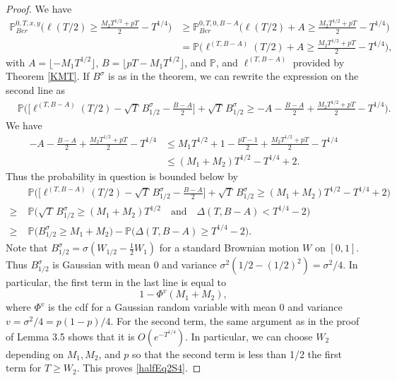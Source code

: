 \begin{proof}
		We have
	\begin{align*}
	\mathbb{P}^{0,T,x,y}_{Ber}\bigg( \ell( T/2 )  \geq \frac{M_2T^{1/2} + p T}{2} - T^{1/4} \bigg) &\geq \mathbb{P}^{0,T,0,B-A}_{Ber}\bigg( \ell( T/2 ) + A  \geq \frac{M_2T^{1/2} + p T}{2} - T^{1/4} \bigg)\\
	&= \mathbb{P}\bigg( \ell^{(T,B-A)}( T/2 ) + A  \geq \frac{M_2T^{1/2} + p T}{2} - T^{1/4} \bigg),
	\end{align*}
	with $A = \lfloor -M_1T^{1/2}\rfloor$, $B = \lfloor pT-M_1T^{1/2}\rfloor$, and $\mathbb{P}$, and $\ell^{(T,B-A)}$ provided by Theorem \ref{KMT}. If $B^\sigma$ is as in the theorem, we can rewrite the expression on the second line as
	\begin{align*}
	& \mathbb{P}\bigg( \bigg[\ell^{(T,B-A)}( T/2 ) -\sqrt{T}\,B^\sigma_{1/2} - \frac{B-A}{2}\bigg] + \sqrt{T}\,B^\sigma_{1/2}  \geq -A - \frac{B-A}{2} + \frac{M_2T^{1/2} + p T}{2} - T^{1/4} \bigg).
	\end{align*}
	We have
	\begin{align*}
	-A - \frac{B-A}{2} + \frac{M_2T^{1/2} + p T}{2} - T^{1/4} & \leq M_1T^{1/2} + 1 - \frac{pT-1}{2} + \frac{M_2T^{1/2} + p T}{2} - T^{1/4}\\
	&\leq (M_1 + M_2)T^{1/2} - T^{1/4} + 2.
	\end{align*}
	Thus the probability in question is bounded below by
	\begin{align*}
	& \mathbb{P}\bigg( \bigg[\ell^{(T,B-A)}( T/2 ) -\sqrt{T}\,B^\sigma_{1/2} - \frac{B-A}{2}\bigg] + \sqrt{T}\,B^\sigma_{1/2}  \geq (M_1 + M_2)T^{1/2} - T^{1/4} + 2 \bigg)\\
	\geq \; & \mathbb{P}\bigg( \sqrt{T}\,B^\sigma_{1/2} \geq (M_1 + M_2)T^{1/2} \quad \mathrm{and} \quad \Delta(T,B-A) < T^{1/4} - 2 \bigg)\\
	\geq \; & \mathbb{P}\big( B^\sigma_{1/2} \geq M_1 + M_2 \big) - \mathbb{P}\big( \Delta(T,B-A) \geq T^{1/4} - 2 \big).
	\end{align*}
	Note that $B^\sigma_{1/2} = \sigma(W_{1/2} - \frac{1}{2}W_1)$ for a standard Brownian motion $W$ on $[0,1]$. Thus $B^\sigma_{1/2}$ is Gaussian with mean 0 and variance $\sigma^2(1/2-(1/2)^2) = \sigma^2/4$. In particular, the first term in the last line is equal to
	\[
	1 - \Phi^v(M_1+M_2),
	\]
	where $\Phi^v$ is the cdf for a Gaussian random variable with mean 0 and variance $v=\sigma^2/4 = p(1-p)/4$. For the second term, the same argument as in the proof of Lemma 3.5 shows that it is $O(e^{-T^{1/4}})$. In particular, we can choose $W_2$ depending on $M_1,M_2$, and $p$ so that the second term is less than 1/2 the first term for $T\geq W_2$. This proves \eqref{halfEq2S4}.
\end{proof}



